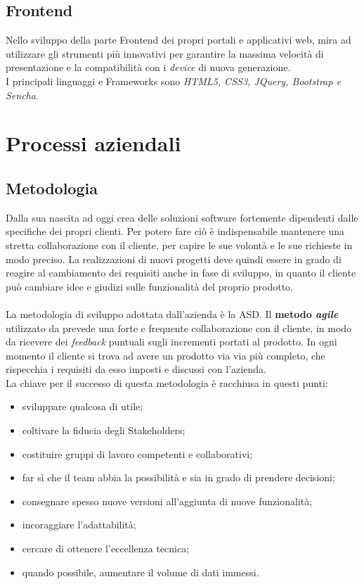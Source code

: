 \subsection{Frontend}
Nello sviluppo della parte \gls{Frontend} dei propri portali e applicativi web, \azienda{} mira ad utilizzare gli strumenti più innovativi per garantire la massima velocità di presentazione e la compatibilità con i \emph{device} di nuova generazione. \\
I principali linguaggi e \glspl{Framework} sono \emph{HTML5, CSS3, JQuery, Bootstrap e Sencha}.

\section{Processi aziendali}
\subsection{Metodologia}
Dalla sua nascita ad oggi \azienda{} crea delle soluzioni software fortemente dipendenti dalle specifiche dei propri clienti. Per potere fare ciò è indispensabile mantenere una stretta collaborazione con il cliente, per capire le sue volontà e le sue richieste in modo preciso. La realizzazioni di nuovi progetti deve quindi essere in grado di reagire al cambiamento dei requisiti anche in fase di sviluppo, in quanto il cliente può cambiare idee e giudizi sulle funzionalità del proprio prodotto.\\ \\
La metodologia di sviluppo adottata dall'azienda è la \gls{ASD}.
Il \textbf{metodo \emph{agile}} utilizzato da \azienda{} prevede una forte e frequente collaborazione con il cliente, in modo da ricevere dei \emph{feedback} puntuali sugli incrementi portati al prodotto. In ogni momento il cliente si trova ad avere un prodotto via via più completo, che rispecchia i requisiti da esso imposti e discussi con l'azienda.\\
La chiave per il successo di questa metodologia è racchiusa in questi punti:
\begin{itemize}
	\item sviluppare qualcosa di utile;
	\item coltivare la fiducia degli \glspl{Stakeholder};
	\item costituire gruppi di lavoro competenti e collaborativi;
	\item far sì che il team abbia la possibilità e sia in grado di prendere decisioni;
	\item consegnare spesso nuove versioni all'aggiunta di nuove funzionalità;
	\item incoraggiare l'adattabilità;
	\item cercare di ottenere l'eccellenza tecnica;
	\item quando possibile, aumentare il volume di dati immessi.
\end{itemize}

